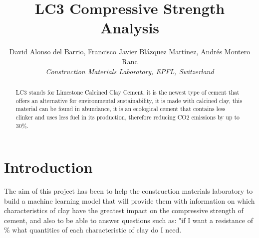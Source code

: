 \documentclass[10pt,conference,compsocconf]{IEEEtran}
\begin{document}
\title{LC3 Compressive Strength Analysis}
\author{
  David Alonso del Barrio, Francisco Javier Blázquez Martínez, Andrés Montero Ranc\\
  \textit{Construction Materials Laboratory, EPFL, Switzerland}
}

\maketitle

\begin{abstract}
LC3 stands for Limestone Calcined Clay Cement, it is the newest type of cement that offers an alternative for environmental sustainability, it is made with calcined clay, this material can be found in abundance, it is an ecological cement that contains less clinker and uses less fuel in its production, therefore reducing CO2 emissions by up to 30\%.
\end{abstract}

\section{Introduction}

The aim of this project has been to help the construction materials laboratory to build a machine learning model that will provide them with information on which characteristics of clay have the greatest impact on the compressive strength of cement, and also to be able to answer questions such as: "if I want a resistance of \% what quantities of each characteristic of clay do I need. 
\end{document}
